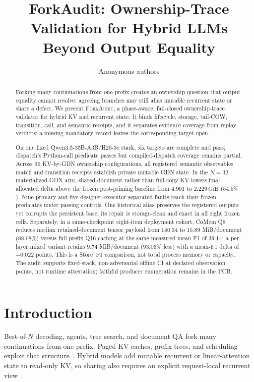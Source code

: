 \documentclass{article}
\title{ForkAudit: Ownership-Trace Validation for Hybrid LLMs Beyond Output Equality}
\author{Anonymous authors}
\newcommand{\method}{\textsc{ForkAudit}}
\newcommand{\gib}{\,\mathrm{GiB}}
\begin{document}
\raggedbottom
\maketitle

\begin{abstract}
Forking many continuations from one prefix creates an ownership question that
output equality cannot resolve: agreeing branches may still alias mutable
recurrent state or share a defect.  We present \method{}, a phase-aware,
fail-closed ownership-trace validator for hybrid KV and recurrent state.  It
binds lifecycle, storage, tail-COW, transition, call, and semantic receipts,
and it separates evidence coverage from replay verdicts: a missing mandatory
record leaves the corresponding target open.

On one fixed Qwen3.5-35B-A3B/H20-3e stack, six targets are complete and pass;
dispatch's Python-call predicate passes but compiled-dispatch coverage remains
partial.  Across 96 KV-by-GDN ownership configurations, all registered semantic
observables match and transition receipts establish private mutable GDN state.
In the $N=32$ materialized-GDN arm, shared-document rather than full-copy KV
lowers final allocated delta above the frozen post-priming baseline from
$4.901$ to $2.229\gib$ ($54.5\%$).  Nine primary and five
designer--executor-separated faults reach their frozen predicates under passing
controls.  One historical alias preserves the registered outputs yet corrupts
the persistent base; its repair is storage-clean and exact in all eight frozen
cells.  Separately, in a same-checkpoint eight-item deployment cohort, CoMem Q8
reduces median retained-document tensor payload from $140.34$ to $15.89$
MiB/document ($88.68\%$) versus full-prefix Q16 caching at the same measured mean
F1 of $39.14$; a per-layer mixed variant retains $9.74$ MiB/document ($93.06\%$
less) with a mean-F1 delta of $-0.022$ points.  This is a Store--F1 comparison,
not total process memory or capacity.  The audit supports fixed-stack,
non-adversarial offline CI at declared observation points, not runtime
attestation; faithful producer enumeration remains in the TCB.
\end{abstract}

\section{Introduction}
\label{sec:intro}

Best-of-$N$ decoding, agents, tree search, and document QA fork many
continuations from one prefix.  Paged KV caches, prefix trees, and scheduling
exploit that structure~\citep{kwon2023pagedattention,zheng2024sglang,
gim2024promptcache,srivatsa2025preble}.  Hybrid models add mutable recurrent or
linear-attention state to read-only KV, so sharing also requires an explicit
request-local recurrent view~\citep{yang2025gateddeltanet,lieber2025jamba,
pan2025marconi}.
\end{document}
